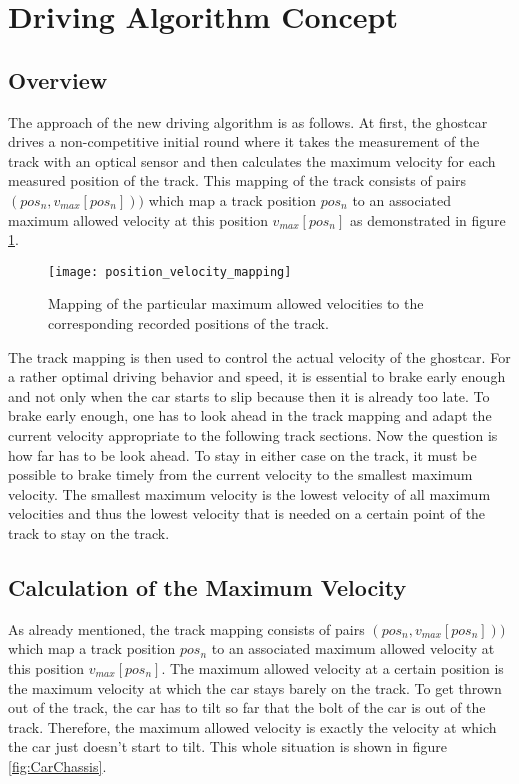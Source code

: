 \section{Driving Algorithm Concept}

\subsection{Overview}
The approach of the new driving algorithm is as follows. At first, the ghostcar drives a non-competitive initial round where it takes the measurement of the
track with an optical sensor and then calculates the maximum velocity for each measured position of the track. This mapping of the track consists of pairs
$(pos_{n}, v_{max}[pos_{n}]))$ which map a track position $pos_{n}$ to an associated maximum allowed velocity at this position $v_{max}[pos_{n}]$ as demonstrated in
figure \ref{fig:PositionVelocityMapping}.
 
\begin{figure}[h]
\centering
\texttt{[image: position\_velocity\_mapping]}
\caption{Mapping of the particular maximum allowed velocities to the corresponding recorded positions of the track.}
\label{fig:PositionVelocityMapping}
\end{figure}

The track mapping is then used to control the actual velocity of the ghostcar. For a rather optimal driving behavior and speed, it is essential to
brake early enough and not only when the car starts to slip because then it is already too late. To brake early enough, one has to look ahead in the track mapping and adapt
the current velocity appropriate to the following track sections. Now the question is how far has to be look ahead. To stay in either case on the track,
it must be possible to brake timely from the current velocity to the smallest maximum velocity. The smallest maximum velocity is the lowest velocity of all
maximum velocities and thus the lowest velocity that is needed on a certain point of the track to stay on the track.


\subsection{Calculation of the Maximum Velocity}

As already mentioned, the track mapping consists of pairs $(pos_{n}, v_{max}[pos_{n}]))$ which map a track position $pos_{n}$ to an associated maximum allowed
velocity at this position $v_{max}[pos_{n}]$. The maximum allowed velocity at a certain position is the maximum velocity at which the car stays barely on the
track. To get thrown out of the track, the car has to tilt so far that the bolt of the car is out of the track. Therefore, the maximum allowed velocity is
exactly the velocity at which the car just doesn't start to tilt. This whole situation is shown in figure \ref{fig:CarChassis}.

